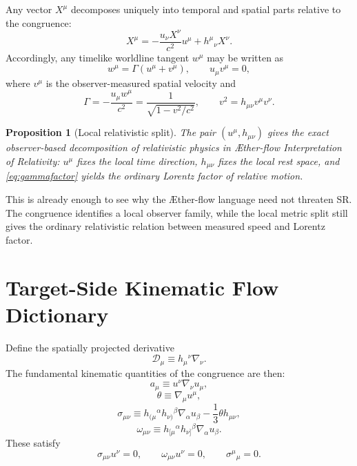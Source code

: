\documentclass[11pt]{article}
\newcommand{\Aflow}{\AE{}ther-flow}
\newcommand{\TheoryName}{\Aflow{} Interpretation of Relativity}
\newcommand{\Proj}{\mathcal{D}}
\newtheorem{proposition}{Proposition}
\begin{document}
Any vector \(X^\mu\) decomposes uniquely into temporal and spatial parts relative to the congruence:
\begin{equation}
X^\mu
=
-\frac{u_\nu X^\nu}{c^2}u^\mu
+
h^\mu{}_{\nu}X^\nu.
\label{eq:vectordecomp}
\end{equation}
Accordingly, any timelike worldline tangent \(w^\mu\) may be written as
\begin{equation}
w^\mu
=
\Gamma\left(u^\mu+v^\mu\right),
\qquad
u_\mu v^\mu=0,
\label{eq:reldecomp}
\end{equation}
where \(v^\mu\) is the observer-measured spatial velocity and
\begin{equation}
\Gamma
=
-\frac{u_\mu w^\mu}{c^2}
=
\frac{1}{\sqrt{1-v^2/c^2}},
\qquad
v^2=h_{\mu\nu}v^\mu v^\nu.
\label{eq:gammafactor}
\end{equation}

\begin{proposition}[Local relativistic split]
The pair \((u^\mu,h_{\mu\nu})\) gives the exact observer-based decomposition of relativistic physics in \TheoryName{}: \(u^\mu\) fixes the local time direction, \(h_{\mu\nu}\) fixes the local rest space, and \eqref{eq:gammafactor} yields the ordinary Lorentz factor of relative motion.
\end{proposition}

This is already enough to see why the \Aflow{} language need not threaten SR. The congruence identifies a local observer family, while the local metric split still gives the ordinary relativistic relation between measured speed and Lorentz factor.

\section{Target-Side Kinematic Flow Dictionary}

Define the spatially projected derivative
\begin{equation}
\Proj_\mu \equiv h_\mu{}^\nu \nabla_\nu.
\label{eq:projectedderivative}
\end{equation}
The fundamental kinematic quantities of the congruence are then:
\begin{equation}
a_\mu \equiv u^\nu \nabla_\nu u_\mu,
\label{eq:acceleration}
\end{equation}
\begin{equation}
\theta \equiv \nabla_\mu u^\mu,
\label{eq:expansion}
\end{equation}
\begin{equation}
\sigma_{\mu\nu}
\equiv
h_{(\mu}{}^\alpha h_{\nu)}{}^\beta \nabla_\alpha u_\beta
-\frac{1}{3}\theta h_{\mu\nu},
\label{eq:shear}
\end{equation}
\begin{equation}
\omega_{\mu\nu}
\equiv
h_{[\mu}{}^\alpha h_{\nu]}{}^\beta \nabla_\alpha u_\beta.
\label{eq:vorticity}
\end{equation}
These satisfy
\begin{equation}
\sigma_{\mu\nu}u^\nu = 0,
\qquad
\omega_{\mu\nu}u^\nu = 0,
\qquad
\sigma^\mu{}_\mu = 0.
\label{eq:kinematicprops}
\end{equation}
\end{document}

